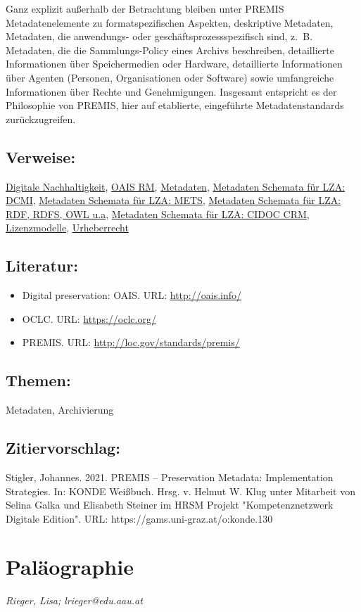 \documentclass{article}
\begin{document}
        Ganz explizit außerhalb der Betrachtung bleiben unter PREMIS Metadatenelemente zu formatspezifischen Aspekten, deskriptive Metadaten, Metadaten, die anwendungs- oder geschäftsprozessspezifisch sind, z. B. Metadaten, die die Sammlungs-Policy eines Archivs beschreiben, detaillierte Informationen über Speichermedien oder Hardware, detaillierte Informationen über Agenten (Personen, Organisationen oder Software) sowie umfangreiche Informationen über Rechte und Genehmigungen. Insgesamt entspricht es der Philosophie von PREMIS, hier auf etablierte, eingeführte Metadatenstandards zurückzugreifen.\\
            
        \subsection*{Verweise:}\href{https://gams.uni-graz.at/o:konde.6}{Digitale Nachhaltigkeit}, \href{https://gams.uni-graz.at/o:konde.11}{OAIS RM}, \href{https://gams.uni-graz.at/o:konde.25}{Metadaten}, \href{https://gams.uni-graz.at/o:konde.128}{Metadaten Schemata für LZA: DCMI}, \href{https://gams.uni-graz.at/o:konde.129}{Metadaten Schemata für LZA: METS}, \href{https://gams.uni-graz.at/o:konde.131}{Metadaten Schemata für LZA: RDF, RDFS, OWL u.a}, \href{https://gams.uni-graz.at/o:konde.133}{Metadaten Schemata für LZA: CIDOC CRM}, \href{https://gams.uni-graz.at/o:konde.9}{Lizenzmodelle}, \href{https://gams.uni-graz.at/o:konde.44}{Urheberrecht}\subsection*{Literatur:}\begin{itemize}\item Digital preservation: OAIS. URL: \url{http://oais.info/}\item OCLC. URL: \url{https://oclc.org/}\item PREMIS. URL: \url{http://loc.gov/standards/premis/}\end{itemize}\subsection*{Themen:}Metadaten, Archivierung\subsection*{Zitiervorschlag:}Stigler, Johannes. 2021. PREMIS – Preservation Metadata: Implementation Strategies. In: KONDE Weißbuch. Hrsg. v. Helmut W. Klug unter Mitarbeit von Selina Galka und Elisabeth Steiner im HRSM Projekt "Kompetenznetzwerk Digitale Edition". URL: https://gams.uni-graz.at/o:konde.130\newpage\section*{Paläographie} \emph{Rieger, Lisa; lrieger@edu.aau.at }\\
        
\end{document}
